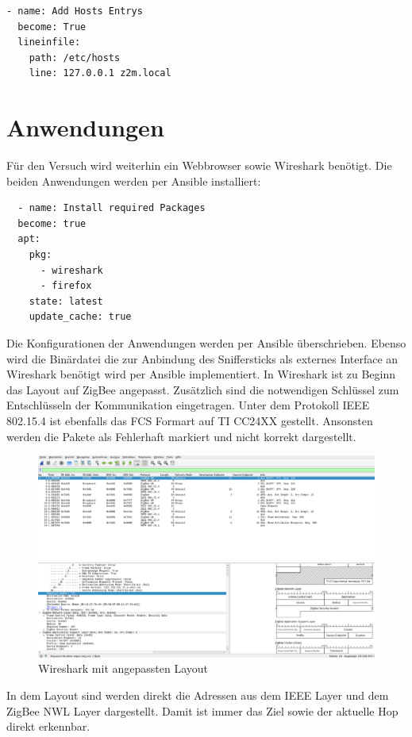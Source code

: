 \begin{lstlisting}
- name: Add Hosts Entrys
  become: True
  lineinfile:
    path: /etc/hosts
    line: 127.0.0.1 z2m.local
\end{lstlisting}

\section{Anwendungen}

Für den Versuch wird weiterhin ein Webbrowser sowie Wireshark benötigt. Die beiden Anwendungen werden per Ansible installiert:
\begin{lstlisting}
  - name: Install required Packages
  become: true
  apt:
    pkg:
      - wireshark
      - firefox
    state: latest
    update_cache: true
\end{lstlisting}

Die Konfigurationen der Anwendungen werden per Ansible überschrieben. Ebenso wird die Binärdatei die zur Anbindung des Sniffersticks als externes Interface an Wireshark benötigt wird 
per Ansible implementiert. In Wireshark ist zu Beginn das Layout auf ZigBee angepasst. Zusätzlich sind die notwendigen Schlüssel zum Entschlüsseln der Kommunikation eingetragen. Unter 
dem Protokoll IEEE 802.15.4 ist ebenfalls das FCS Formart auf TI CC24XX gestellt. Ansonsten werden die Pakete als Fehlerhaft markiert und nicht korrekt dargestellt.

\begin{figure}[H]
  \centering
  \includegraphics[width=1\textwidth]{media/ws-configured.png}
  \caption{Wireshark mit angepassten Layout}
\end{figure}

In dem Layout sind werden direkt die Adressen aus dem IEEE Layer und dem ZigBee NWL Layer dargestellt. Damit ist immer das Ziel sowie der aktuelle Hop direkt erkennbar.

